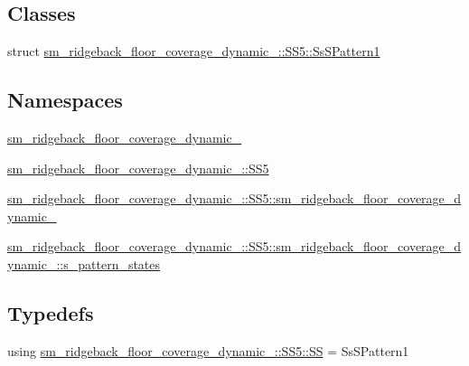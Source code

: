 \subsection*{Classes}
\begin{DoxyCompactItemize}
\item 
struct \hyperlink{structsm__ridgeback__floor__coverage__dynamic__1_1_1SS5_1_1SsSPattern1}{sm\+\_\+ridgeback\+\_\+floor\+\_\+coverage\+\_\+dynamic\+\_\+::\+S\+S5\+::\+Ss\+S\+Pattern1}
\end{DoxyCompactItemize}
\subsection*{Namespaces}
\begin{DoxyCompactItemize}
\item 
 \hyperlink{namespacesm__ridgeback__floor__coverage__dynamic__1}{sm\+\_\+ridgeback\+\_\+floor\+\_\+coverage\+\_\+dynamic\+\_}
\item 
 \hyperlink{namespacesm__ridgeback__floor__coverage__dynamic__1_1_1SS5}{sm\+\_\+ridgeback\+\_\+floor\+\_\+coverage\+\_\+dynamic\+\_\+::\+S\+S5}
\item 
 \hyperlink{namespacesm__ridgeback__floor__coverage__dynamic__1_1_1SS5_1_1sm__ridgeback__floor__coverage__dynamic__1}{sm\+\_\+ridgeback\+\_\+floor\+\_\+coverage\+\_\+dynamic\+\_\+::\+S\+S5\+::sm\+\_\+ridgeback\+\_\+floor\+\_\+coverage\+\_\+dynamic\+\_}
\item 
 \hyperlink{namespacesm__ridgeback__floor__coverage__dynamic__1_1_1SS5_1_1sm__ridgeback__floor__coverage__dynamic__1_1_1s__pattern__states}{sm\+\_\+ridgeback\+\_\+floor\+\_\+coverage\+\_\+dynamic\+\_\+::\+S\+S5\+::sm\+\_\+ridgeback\+\_\+floor\+\_\+coverage\+\_\+dynamic\+\_\+::s\+\_\+pattern\+\_\+states}
\end{DoxyCompactItemize}
\subsection*{Typedefs}
\begin{DoxyCompactItemize}
\item 
using \hyperlink{namespacesm__ridgeback__floor__coverage__dynamic__1_1_1SS5_aa37fc0a5a5c9436a8a7bec7feb9d3cce}{sm\+\_\+ridgeback\+\_\+floor\+\_\+coverage\+\_\+dynamic\+\_\+::\+S\+S5\+::\+SS} = Ss\+S\+Pattern1
\end{DoxyCompactItemize}
